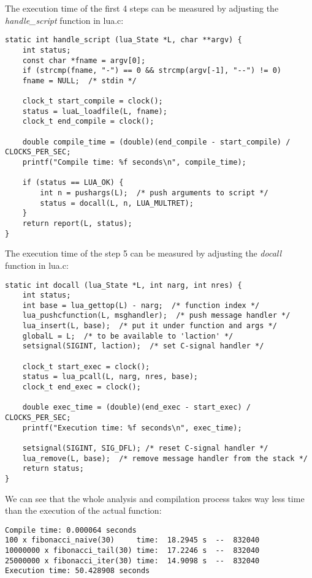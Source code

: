 \documentclass{article}
\begin{document}
	The execution time of the first 4 steps can be measured by adjusting the \textit{handle\_script} function in lua.c:
	\begin{verbatim}
static int handle_script (lua_State *L, char **argv) {
	int status;
	const char *fname = argv[0];
	if (strcmp(fname, "-") == 0 && strcmp(argv[-1], "--") != 0)
	fname = NULL;  /* stdin */
	
	clock_t start_compile = clock();
	status = luaL_loadfile(L, fname);
	clock_t end_compile = clock();
	
	double compile_time = (double)(end_compile - start_compile) / CLOCKS_PER_SEC;
	printf("Compile time: %f seconds\n", compile_time);
	
	if (status == LUA_OK) {
		int n = pushargs(L);  /* push arguments to script */
		status = docall(L, n, LUA_MULTRET);
	}
	return report(L, status);
}
	\end{verbatim}
	The execution time of the step 5 can be measured by adjusting the \textit{docall} function in lua.c:
	\begin{verbatim}
static int docall (lua_State *L, int narg, int nres) {
	int status;
	int base = lua_gettop(L) - narg;  /* function index */
	lua_pushcfunction(L, msghandler);  /* push message handler */
	lua_insert(L, base);  /* put it under function and args */
	globalL = L;  /* to be available to 'laction' */
	setsignal(SIGINT, laction);  /* set C-signal handler */
	
	clock_t start_exec = clock();
	status = lua_pcall(L, narg, nres, base);
	clock_t end_exec = clock();
	
	double exec_time = (double)(end_exec - start_exec) / CLOCKS_PER_SEC;
	printf("Execution time: %f seconds\n", exec_time);
	
	setsignal(SIGINT, SIG_DFL); /* reset C-signal handler */
	lua_remove(L, base);  /* remove message handler from the stack */
	return status;
}
	\end{verbatim}

	We can see that the whole analysis and compilation process takes way less time than the execution of the actual function:
	\begin{verbatim}
Compile time: 0.000064 seconds
100 x fibonacci_naive(30)     time:  18.2945 s  --  832040
10000000 x fibonacci_tail(30) time:  17.2246 s  --  832040
25000000 x fibonacci_iter(30) time:  14.9098 s  --  832040	
Execution time: 50.428908 seconds
	\end{verbatim}
\end{document}
